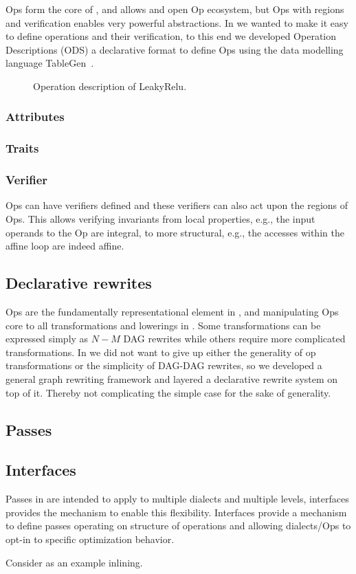 Ops form the core of \MLIR, and \MLIR allows and open Op ecosystem, but Ops
with regions and verification enables very powerful abstractions. In \MLIR we
wanted to make it easy to define operations and their verification, to this end
we developed Operation Descriptions (ODS) a declarative format to define Ops
using the data modelling language TableGen~\cite{tblgen}.

\begin{figure}

\caption{Operation description of LeakyRelu.}
\end{figure}

\subsubsection{Attributes}

\subsubsection{Traits}

\subsubsection{Verifier}

Ops can have verifiers defined and these verifiers can also act upon the
regions of Ops. This allows verifying invariants from local properties, e.g.,
the input operands to the Op are integral, to more structural, e.g., the
accesses within the affine loop are indeed affine.

\subsection{Declarative rewrites}

Ops are the fundamentally representational element in \MLIR, and manipulating
Ops core to all transformations and lowerings in \MLIR. Some transformations
can be expressed simply as $N-M$ DAG rewrites while others require more
complicated transformations. In \MLIR we did not want to give up either the
generality of op transformations or the simplicity of DAG-DAG rewrites, so we
developed a general graph rewriting framework and layered a declarative rewrite
system on top of it. Thereby not complicating the simple case for the sake
of generality.

\subsection{Passes}

\subsection{Interfaces}\label{sec:interfaces}

Passes in \MLIR are intended to apply to multiple dialects and multiple levels,
interfaces provides the mechanism to enable this flexibility. Interfaces
provide a mechanism to define passes operating on structure of operations and
allowing dialects/Ops to opt-in to specific optimization behavior.

Consider as an example inlining.
